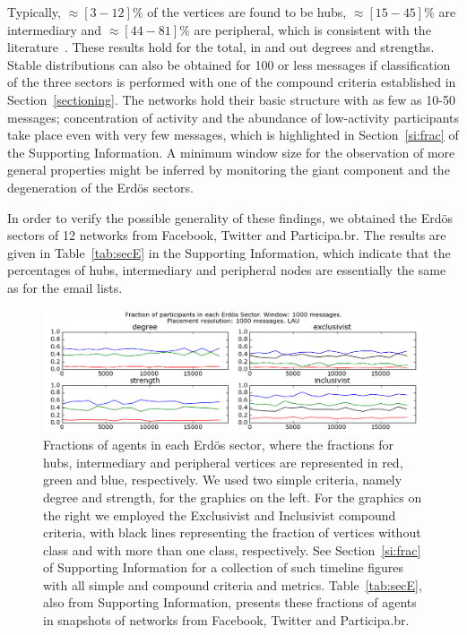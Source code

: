 \documentclass[%
	aip,
	jmp,%
	amsmath,amssymb,
	reprint,%
]{revtex4-1}
\begin{document}
Typically, $\approx [3-12]\%$ of the vertices are found to be hubs, $\approx [15-45]\%$ are intermediary and $\approx [44-81]\%$ are peripheral, which is consistent with the literature~\cite{secFree}.
These results hold for the total, in and out degrees and strengths.
Stable distributions can also be obtained for 100 or less messages if classification of the three sectors is performed with one of the compound criteria established in Section~\ref{sectioning}. 
The networks hold their basic structure with as few as 10-50 messages; concentration of activity and the abundance of low-activity participants take place even with very few messages, which is highlighted in Section~\ref{si:frac} of the Supporting Information.
A minimum window size for the observation of more general properties might be inferred by monitoring the giant component and the degeneration of the Erd\"os sectors.

In order to verify the possible generality of these findings, we obtained the Erd\"os sectors of 12 networks from Facebook, Twitter and Participa.br. The results are given in Table~\ref{tab:secE} in the Supporting Information, which indicate that the percentages of hubs, intermediary and peripheral nodes are essentially the same as for the email lists.

\begin{figure} 
	\centering
	\includegraphics[width=\textwidth]{figs/InText-WLAU-S1000}
	\caption{Fractions of agents in each Erd\"os sector, where the fractions for hubs, intermediary and peripheral vertices are represented in red, green and blue, respectively. We used two simple criteria, namely degree and strength, for the graphics on the left. For the graphics on the right we employed the Exclusivist and Inclusivist compound criteria, with black lines representing the fraction of vertices without class and with more than one class, respectively. See Section~\ref{si:frac} of Supporting Information for a collection of such timeline figures with all simple and compound criteria and metrics. Table~\ref{tab:secE}, also from Supporting Information, presents these fractions of agents in snapshots of networks from Facebook, Twitter and Participa.br.}
	\label{fig:sectIL}
\end{figure}
\end{document}
